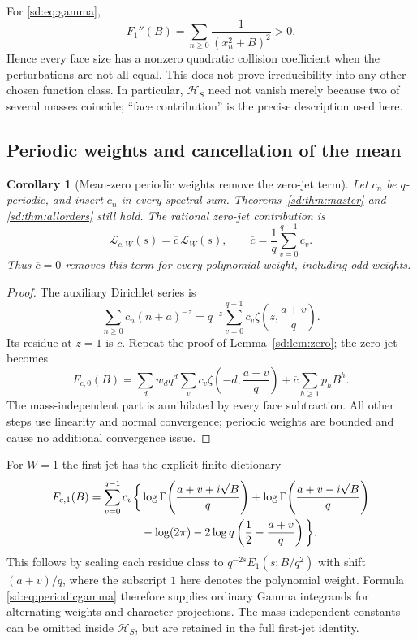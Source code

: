 \documentclass[11pt,a4paper]{article}
\numberwithin{equation}{section}
\newtheorem{corollary}[theorem]{Corollary}
\theoremstyle{definition}
\theoremstyle{remark}
\begin{document}
For \eqref{sd:eq:gamma},
\[
 F_1''(B)=\sum_{n\ge0}\frac1{(x_n^2+B)^2}>0.
\]
Hence every face size has a nonzero quadratic collision coefficient
when the perturbations are not all equal.  This does not prove
irreducibility into any other chosen function class.  In particular,
$\mathcal H_S$ need not vanish merely because two of several masses
coincide; ``face contribution'' is the precise description used here.

\subsection{Periodic weights and cancellation of the mean}
\label{sd:subsec:periodic}

\begin{corollary}[Mean-zero periodic weights remove the zero-jet term]
\label{sd:cor:periodic}
Let $c_n$ be $q$-periodic, and insert $c_n$ in every spectral sum.
Theorems~\ref{sd:thm:master} and \ref{sd:thm:allorders} still hold.
The rational zero-jet contribution is
\begin{equation}\label{sd:eq:periodiclocal}
 \mathcal L_{c,W}(s)=\overline c\,\mathcal L_W(s),\qquad
                  \overline c=\frac1q\sum_{v=0}^{q-1}c_v.
\end{equation}
Thus $\overline c=0$ removes this term for \emph{every} polynomial
weight, including odd weights.
\end{corollary}
\begin{proof}
The auxiliary Dirichlet series is
\[
 \sum_{n\ge0}c_n(n+a)^{-z}
   =q^{-z}\sum_{v=0}^{q-1}c_v
                           \zeta\!\left(z,\frac{a+v}{q}\right).
\]
Its residue at $z=1$ is $\overline c$.  Repeat the proof of
Lemma~\ref{sd:lem:zero}; the zero jet becomes
\[
 F_{c,0}(B)=\sum_d w_dq^d
       \sum_v c_v\zeta\!\left(-d,\frac{a+v}{q}\right)
                    +\overline c\sum_{h\ge1}p_hB^h.
\]
The mass-independent part is annihilated by every face subtraction.
All other steps use linearity and normal convergence; periodic weights
are bounded and cause no additional convergence issue.
\end{proof}

For $W=1$ the first jet has the explicit finite dictionary
\begin{align}\label{sd:eq:periodicgamma}
 F_{c,1}(B)=\sum_{v=0}^{q-1}c_v\bigg\{&
 \log\Gamma\!\left(\frac{a+v+i\sqrt B}{q}\right)
 +\log\Gamma\!\left(\frac{a+v-i\sqrt B}{q}\right)\notag\\
 &-\log(2\pi)-2\log q
                         \left(\frac12-\frac{a+v}{q}\right)\bigg\}.
\end{align}
This follows by scaling each residue class to
$q^{-2s}E_1(s;B/q^2)$ with shift $(a+v)/q$, where the subscript
$1$ here denotes the polynomial weight.  Formula
\eqref{sd:eq:periodicgamma} therefore supplies ordinary Gamma
integrands for alternating weights and character projections.  The
mass-independent constants can be omitted inside $\mathcal H_S$,
but are retained in the full first-jet identity.
\end{document}
